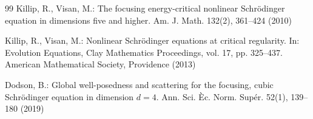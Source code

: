\documentclass[smallextended,envcountsect,nospthms]{svjour3}
\numberwithin{equation}{section}
\theoremstyle{spbreak}
\theoremstyle{spdefbreak}
\theoremstyle{spdefbreak}
\begin{document}
\begin{thebibliography}{99}
Killip, R., Visan, M.: The focusing energy-critical nonlinear Schr\"odinger equation in dimensions five and higher. Am. J. Math. 132(2), 361--424 (2010)

Killip, R., Visan, M.: Nonlinear Schr\"odinger equations at critical regularity. In: Evolution Equations, Clay Mathematics Proceedings, vol. 17, pp. 325--437. American Mathematical Society, Providence (2013)

Dodson, B.: Global well-posedness and scattering for the focusing, cubic Schr\"odinger equation in dimension $d=4$. Ann. Sci. \`Ec. Norm. Sup\'er. 52(1), 139--180 (2019)

\end{thebibliography}
\endgroup
\end{document}
